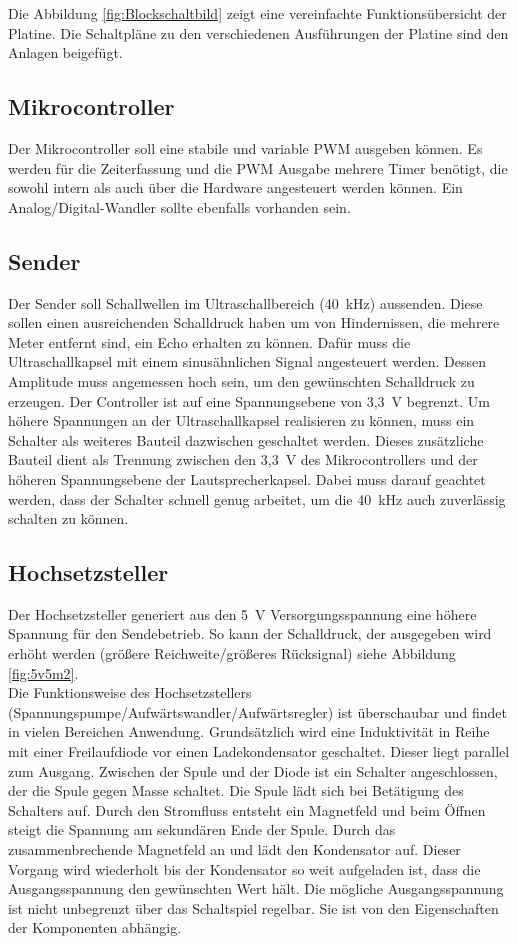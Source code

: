 Die Abbildung \ref{fig:Blockschaltbild} zeigt eine vereinfachte Funktionsübersicht der Platine. Die Schaltpläne zu den verschiedenen Ausführungen der Platine sind den Anlagen beigefügt.

\subsection{Mikrocontroller}
Der Mikrocontroller soll eine stabile und variable PWM ausgeben können. Es werden für die Zeiterfassung und die PWM Ausgabe mehrere Timer benötigt, die sowohl intern als auch über die Hardware angesteuert werden können. Ein Analog/Digital-Wandler sollte ebenfalls vorhanden sein.

\subsection{Sender}
Der Sender soll Schallwellen im Ultraschallbereich (40~kHz) aussenden. Diese sollen einen ausreichenden Schalldruck haben um von Hindernissen, die mehrere Meter entfernt sind, ein Echo erhalten zu können. Dafür muss die Ultraschallkapsel mit einem sinusähnlichen Signal angesteuert werden. Dessen Amplitude muss angemessen hoch sein, um den gewünschten Schalldruck zu erzeugen. Der Controller ist auf eine Spannungsebene von 3,3~V begrenzt. Um höhere Spannungen an der Ultraschallkapsel realisieren zu können, muss ein Schalter als weiteres Bauteil dazwischen geschaltet werden. Dieses zusätzliche Bauteil dient als Trennung zwischen den 3,3~V des Mikrocontrollers und der höheren Spannungsebene der Lautsprecherkapsel. Dabei muss darauf geachtet werden, dass der Schalter schnell genug arbeitet, um die 40~kHz auch zuverlässig schalten zu können.

\subsection{Hochsetzsteller}
Der Hochsetzsteller generiert aus den 5~V Versorgungsspannung eine höhere Spannung für den Sendebetrieb. So kann der Schalldruck, der ausgegeben wird erhöht werden (größere Reichweite/größeres Rücksignal) siehe Abbildung \ref{fig:5v5m2}.\\
Die Funktionsweise des Hochsetzstellers (Spannungspumpe/Aufwärtswandler/Aufwärtsregler) ist überschaubar und findet in vielen Bereichen Anwendung. Grundsätzlich wird eine Induktivität in Reihe mit einer Freilaufdiode vor einen Ladekondensator geschaltet. Dieser liegt parallel zum Ausgang. Zwischen der Spule und der Diode ist ein Schalter angeschlossen, der die Spule gegen Masse schaltet. Die Spule lädt sich bei Betätigung des Schalters auf. Durch den Stromfluss entsteht ein Magnetfeld und beim Öffnen steigt die Spannung am sekundären Ende der Spule. Durch das zusammenbrechende Magnetfeld an und lädt den Kondensator auf. Dieser Vorgang wird wiederholt bis der Kondensator so weit aufgeladen ist, dass die Ausgangsspannung den gewünschten Wert hält. Die mögliche Ausgangsspannung ist nicht unbegrenzt über das Schaltspiel regelbar. Sie ist von den Eigenschaften der Komponenten abhängig. 

